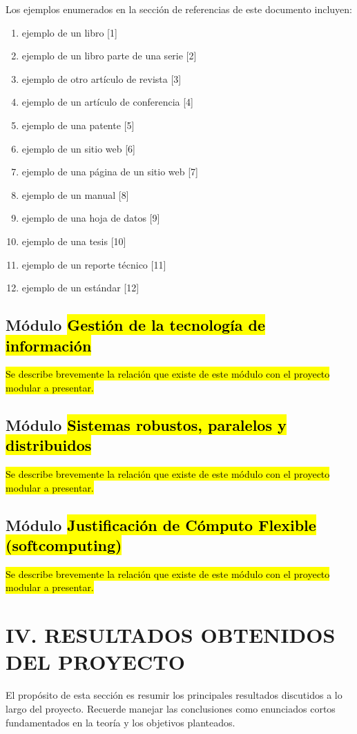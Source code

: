 ﻿\documentclass[10pt,twocolumn]{article}
\begin{document}
Los ejemplos enumerados en la sección de referencias de este documento incluyen:
\begin{enumerate}[leftmargin=*,label=\alph*.)]
  \item ejemplo de un libro [1]
  \item ejemplo de un libro parte de una serie [2]
  \item ejemplo de otro artículo de revista [3]
  \item ejemplo de un artículo de conferencia [4]
  \item ejemplo de una patente [5]
  \item ejemplo de un sitio web [6]
  \item ejemplo de una página de un sitio web [7]
  \item ejemplo de un manual [8]
  \item ejemplo de una hoja de datos [9]
  \item ejemplo de una tesis [10]
  \item ejemplo de un reporte técnico [11]
  \item ejemplo de un estándar [12]
\end{enumerate}

\subsection*{Módulo \hl{Gestión de la tecnología de información}}
\hl{Se describe brevemente la relación que existe de este módulo con el proyecto modular a presentar.}

\subsection*{Módulo \hl{Sistemas robustos, paralelos y distribuidos}}
\hl{Se describe brevemente la relación que existe de este módulo con el proyecto modular a presentar.}

\subsection*{Módulo \hl{Justificación de Cómputo Flexible (softcomputing)}}
\hl{Se describe brevemente la relación que existe de este módulo con el proyecto modular a presentar.}

\section*{IV. RESULTADOS OBTENIDOS DEL PROYECTO}
El propósito de esta sección es resumir los principales resultados discutidos a lo largo del proyecto. Recuerde manejar las conclusiones como enunciados cortos fundamentados en la teoría y los objetivos planteados.
\end{document}
